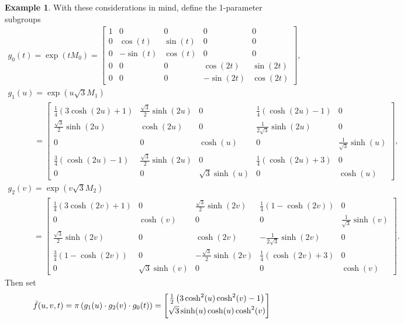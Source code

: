 \documentclass[pdftex]{sigma}
\numberwithin{equation}{section}
\theoremstyle{definition}
\newtheorem{exmpl}[teo]{Example}
\begin{document}
\begin{exmpl}
With these considerations in mind, def\/ine the 1-parameter subgroups
\begin{gather*}
g_0(t)= \exp(tM_0) =
\begin{bmatrix}
1 & 0 & 0 & 0 & 0
\\
0 & \cos(t) & \sin(t) & 0 & 0
\\
0 & -\sin(t) & \cos(t) & 0 & 0
\\
0 & 0 & 0 & \cos(2t) & \sin(2t)
\\
0 & 0 & 0 & -\sin(2t) & \cos(2t)
\end{bmatrix},
\\
g_1(u)= \exp(u \sqrt{3} M_1)
\\
\phantom{g_1(u)}
=
\begin{bmatrix}
\tfrac{1}{4}(3 \cosh(2u) + 1) & \tfrac{\sqrt{3}}{2}\sinh(2u) & 0 & \tfrac{1}{4} (\cosh(2u) - 1) & 0
\\
\tfrac{\sqrt{3}}{2}\sinh(2u) & \cosh(2u) & 0 & \tfrac{1}{2\sqrt{3}} \sinh(2u) & 0
\\
0 & 0 & \cosh(u) & 0 & \tfrac{1}{\sqrt{3}} \sinh(u)
\\
\tfrac{3}{4}(\cosh(2u)-1) & \tfrac{\sqrt{3}}{2}\sinh(2u) & 0 & \tfrac{1}{4}(\cosh(2u) + 3) & 0
\\
0 & 0 & \sqrt{3} \sinh(u) & 0 & \cosh(u)
\end{bmatrix},
\\
g_2(v)= \exp(v \sqrt{3} M_2)
\\
\phantom{g_2(v)}
=
\begin{bmatrix}
\tfrac{1}{4}(3 \cosh(2v) + 1) & 0 & \tfrac{\sqrt{3}}{2}\sinh(2v) & \tfrac{1}{4} (1 - \cosh(2v)) & 0
\\
0 & \cosh(v) & 0 & 0 & \tfrac{1}{\sqrt{3}}\sinh(v)
\\
\tfrac{\sqrt{3}}{2}\sinh(2v) & 0 & \cosh(2v) & -\tfrac{1}{2\sqrt{3}} \sinh(2v) & 0
\\
\tfrac{3}{4}(1 - \cosh(2v)) & 0 & -\tfrac{\sqrt{3}}{2}\sinh(2v) & \tfrac{1}{4}(\cosh(2v) + 3) & 0
\\
0 & \sqrt{3} \sinh(v) & 0 & 0 & \cosh(v)
\end{bmatrix}.
\end{gather*}
Then set
\begin{gather}
\bar{f}(u,v,t) = \pi\left(g_1(u) \cdot g_2(v) \cdot g_0(t) \right) =
\begin{bmatrix}
\tfrac{1}{2}\left(3\cosh^2(u)\cosh^2(v) - 1 \right)
\vspace{1mm}\\
\sqrt{3} \sinh(u) \cosh(u) \cosh^2(v)
\vspace{1mm}\\

\end{bmatrix}
\end{gather}
\end{exmpl}
\end{document}
